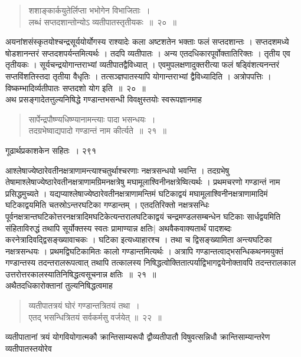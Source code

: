 \documentclass[11pt, openany]{book}
\begin{document}
\begin{quote}
{\ssi  शशाङ्कार्कयुतेर्लिप्ता भभोगेन विभाजिताः~।\\ 
लब्धं सप्तदशान्तोन्योऽ व्यतीपातस्तृतीयकः~॥~२०~॥ }
\end{quote}

 अयनांशसंस्कृतयोश्चन्द्रसूर्ययोर्योगस्य राश्यादेः कला अष्टशतेन भक्ताः फलं सप्तदशान्तः । सप्तदशमध्ये षोडशानन्तरं सप्तदशपर्यन्तमित्यर्थः । तदपि व्यतीपातः । अन्य एतदधिकारपूर्वोक्तातिरिक्तः । तृतीय एव तृतीयकः । सूर्यचन्द्रयोगान्तराभ्यां व्यतीपातद्वैविध्यात् । एवमुपलक्षणादुक्तरीत्या फलं षड्विंशत्यनन्तरं सप्तविंशतिस्तदा तृतीया वैधृतिः । तत्सञ्ज्ञपातस्यापि योगान्तराभ्यां द्वैविध्यादिति । अत्रोपपत्तिः । विष्कम्भादिर्व्यतीपातः सप्तदशो योग इति~॥~२०~॥\\
 \noindent अथ प्रसङ्गादेतत्तुल्यनिषिद्धे गण्डान्तभसन्धी विवक्षुस्तयोः स्वरूपज्ञानमाह \textendash

\begin{quote}
{\ssi सार्पेन्द्रपौष्ण्यधिष्ण्यानामन्त्याः पादा भसन्धयः~।\\ 
तदग्रभेष्वाद्यपादो गण्डान्तं नाम कीर्त्यते~॥~२१~॥}
%
\end{quote}
\newpage

\hspace{3cm} गूढार्थप्रकाशकेन सहितः~। \hfill २९१
\vspace{1cm}


 आश्लेषाज्येष्ठारेवतीनक्षत्राणामन्त्याश्चतुर्थाश्चरणाः नक्षत्रसन्धयो भवन्ति । तदग्रभेषु तेषामाश्लेषाज्येष्ठारेवतीनक्षत्राणामग्रिमनक्षत्रेषु मघामूलाश्विनीनक्षत्रेष्वित्यर्थः । प्रथमचरणो गण्डान्तं नाम प्रसिद्धमुच्यते । यद्यप्याश्लेषाज्येष्ठारेवतीनक्षत्राणामन्तिमं घटिकाद्वयं मघामूलाश्विनीनक्षत्राणामादिमं घटिकाद्वयमिति चतस्रोऽन्तरघटिका गण्डान्तम् । एतदतिरिक्तो नक्षत्रसन्धिः पूर्वनक्षत्रान्तघटिकोत्तरनक्षत्रादिमघटिकेत्यन्तरालघटिकाद्वयं चन्द्रमण्डलसम्बन्धेन घटिकाः सार्धद्वयमिति संहिताविरुद्धं तथापि सूर्योक्तस्य स्वतः प्रामाण्यान्न क्षतिः| अथवैकवाक्यतार्थं पादशब्दः करनेत्रादिवद्द्विसङ्ख्यावाचकः । घटिका इत्यध्याहारश्च । तथा च द्विसङ्ख्यामिता अन्त्यघटिका नक्षत्रसन्धयः । प्रथमद्विघटिकामितः कालो गण्डान्तमित्यर्थः । अत्रापि गण्डान्तत्वाद्भसन्धिकथनमयुक्तं गण्डान्तस्य तदन्तरालरूपत्वात् तथापि तत्कालस्य निषिद्धत्वोक्तितात्पर्याद्विभागद्वयेनोक्तावपि तदन्तरालकाल उत्तरोत्तरकालस्यातिनिषिद्धत्वसूचनान्न क्षतिः~॥~२१~॥\\
 \noindent अथैतदधिकारोक्तानां तुल्यनिषिद्धत्वमाह \textendash

\begin{quote}
{\ssi व्यतीपातत्रयं घोरं गण्डान्तत्रितयं तथा~।\\
 एतद् भसन्धित्रितयं सर्वकर्मसु वर्जयेत् ॥~२२~॥ }
\end{quote}
 व्यतीपातानां त्रयं योगवियोगात्मकौ क्रान्तिसाम्यरूपौ द्वौव्यतीपातौ विषुवत्सन्निधौ क्रान्तिसाम्यान्तरेण व्यतीपातस्तयोरेव \textendash
\end{document}
